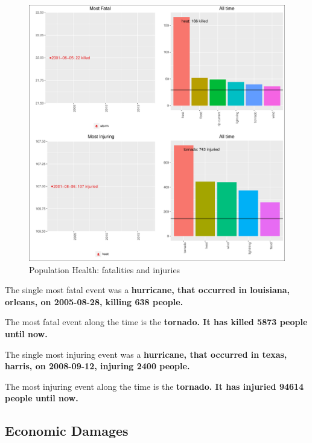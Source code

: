 \documentclass[]{article}
\begin{document}
\begin{figure}[htbp]
\centering
\includegraphics{readme_files/figure-latex/health-plot-1.pdf}
\caption{Population Health: fatalities and injuries}
\end{figure}

The single most fatal event was a \textbf{hurricane, that occurred in
louisiana, orleans, on 2005-08-28, killing 638 people.}

The most fatal event along the time is the \textbf{tornado. It has
killed 5873 people until now.}

The single most injuring event was a \textbf{hurricane, that occurred in
texas, harris, on 2008-09-12, injuring 2400 people.}

The most injuring event along the time is the \textbf{tornado. It has
injuried 94614 people until now.}

\subsection{Economic Damages}\label{economic-damages}
\end{document}
